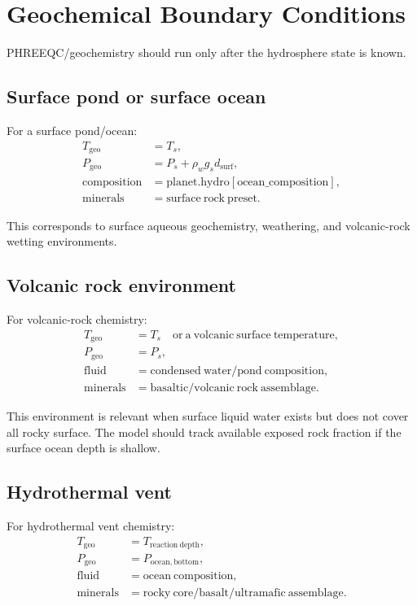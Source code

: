 \documentclass[11pt]{article}
\begin{document}
\section{Geochemical Boundary Conditions}

PHREEQC/geochemistry should run only after the hydrosphere state is known.

\subsection{Surface pond or surface ocean}

For a surface pond/ocean:
\begin{align}
    T_{\mathrm{geo}} &= T_s, \\
    P_{\mathrm{geo}} &= P_s + \rho_w g_s d_{\mathrm{surf}}, \\
    \mathrm{composition} &= \mathrm{planet.hydro[ocean\_composition]}, \\
    \mathrm{minerals} &= \mathrm{surface\ rock\ preset}.
\end{align}

This corresponds to surface aqueous geochemistry, weathering, and volcanic-rock
wetting environments.

\subsection{Volcanic rock environment}

For volcanic-rock chemistry:
\begin{align}
    T_{\mathrm{geo}} &= T_s \quad \mathrm{or\ a\ volcanic\ surface\ temperature}, \\
    P_{\mathrm{geo}} &= P_s, \\
    \mathrm{fluid} &= \mathrm{condensed\ water/pond\ composition}, \\
    \mathrm{minerals} &= \mathrm{basaltic/volcanic\ rock\ assemblage}.
\end{align}

This environment is relevant when surface liquid water exists but does not cover
all rocky surface. The model should track available exposed rock fraction if the
surface ocean depth is shallow.

\subsection{Hydrothermal vent}

For hydrothermal vent chemistry:
\begin{align}
    T_{\mathrm{geo}} &= T_{\mathrm{reaction\ depth}}, \\
    P_{\mathrm{geo}} &= P_{\mathrm{ocean,bottom}}, \\
    \mathrm{fluid} &= \mathrm{ocean\ composition}, \\
    \mathrm{minerals} &= \mathrm{rocky\ core/basalt/ultramafic\ assemblage}.
\end{align}
\end{document}
